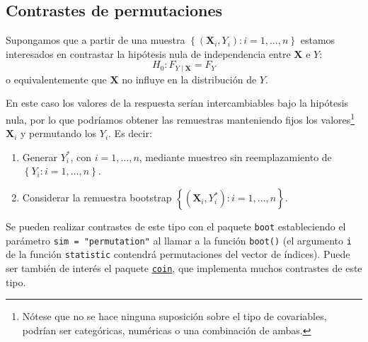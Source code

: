 \documentclass[
  spanish,
  10pt,
]{book}
\renewcommand{\mathbf}[1]{\symbf{#1}}
\theoremstyle{break}
\theoremstyle{nonumberplain}
\let\oldfootnote\footnote
\renewcommand\footnote[1]{\oldfootnote{\hspace{2mm}#1}}
\begin{document}
\subsection{Contrastes de permutaciones}\label{contrastes-de-permutaciones}

Supongamos que a partir de una muestra
\(\left\{ \left( \mathbf{X}_i, Y_i\right): i=1,\ldots, n \right\}\)
estamos interesados en contrastar la hipótesis nula de independencia
entre \(\mathbf{X}\) e \(Y\):
\[H_0: F_{Y \mid \mathbf{X}} = F_Y\]
o equivalentemente que \(\mathbf{X}\) no influye en la distribución de \(Y\).

En este caso los valores de la respuesta serían intercambiables bajo la hipótesis nula,
por lo que podríamos obtener las remuestras manteniendo fijos los valores\footnote{Nótese que
  no se hace ninguna suposición sobre el tipo de covariables,
  podrían ser categóricas, numéricas o una combinación de ambas.}
\(\mathbf{X}_i\) y permutando los \(Y_i\). Es decir:

\begin{enumerate}
\def\labelenumi{\arabic{enumi}.}
\item
  Generar \(Y^{\ast}_i\), con \(i=1,\ldots, n\), mediante muestreo
  sin reemplazamiento de \(\left\{ Y_i: i=1,\ldots, n \right\}\).
\item
  Considerar la remuestra bootstrap
  \(\left\{ \left( \mathbf{X}_i, Y^{\ast}_i\right): i=1,\ldots, n \right\}\).
\end{enumerate}

Se pueden realizar contrastes de este tipo con el paquete \texttt{boot} estableciendo
el parámetro \texttt{sim\ =\ "permutation"} al llamar a la función \texttt{boot()} (el argumento
\texttt{i} de la función \texttt{statistic} contendrá permutaciones del vector de índices).
Puede ser también de interés el paquete \href{https://cran.r-project.org/web/packages/coin/index.html}{\texttt{coin}},
que implementa muchos contrastes de este tipo.
\end{document}
